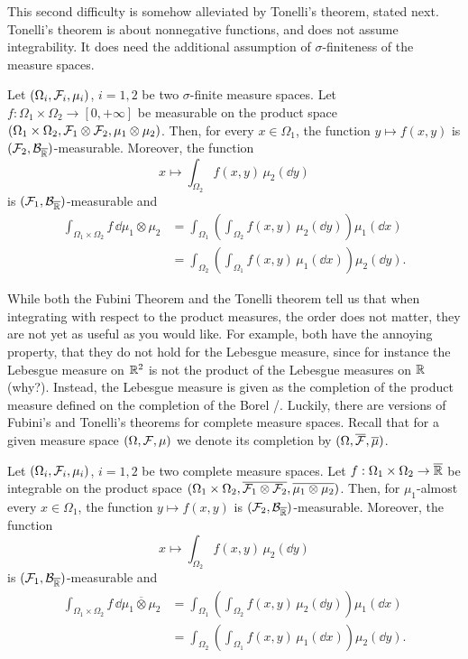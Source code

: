 This second difficulty is somehow alleviated by Tonelli's theorem, stated next. Tonelli's theorem is about nonnegative functions, and does not assume integrability. It does need the additional assumption of $\sigma$-finiteness of the measure spaces.

\begin{theorem}
	Let $(\Omega_i, \mathcal F_i, \mu_i)$, $i=1,2$ be two $\sigma$-finite measure spaces. 
	Let $f : \Omega_1 \times \Omega_2 \to [0,+\infty]$ be measurable on the product space $(\Omega_1 \times \Omega_2, \mathcal F_1 \otimes \mathcal F_2, \mu_1 \otimes \mu_2)$. Then, for every $x \in \Omega_1$, the function $y \mapsto f(x, y)$ is $(\mathcal F_2,\mathcal B_{\overline{\mathbb R}})$-measurable. Moreover, the function 
	\[
	x \mapsto \int_{\Omega_2} f(x,y)\, \mu_2(\dd y)
	\]
	is $(\mathcal F_1,\mathcal B_{\overline{\mathbb R}})$-measurable and
	\[
	\begin{split}
	\int_{\Omega_1 \times \Omega_2} f\, \dd \mu_1 \otimes \mu_2 
	&= \int_{\Omega_1} \left( \int_{\Omega_2 } f(x,  y ) \,\mu_2(\dd y) \right) \mu_1(\dd x)\\
	&= \int_{\Omega_2} \left( \int_{\Omega_1} f(x, y)  \,\mu_1(\dd x) \right) \mu_2(\dd y).
	\end{split}
	\] 
\end{theorem}

While both the Fubini Theorem and the Tonelli theorem tell us that when integrating with respect to the product measures, the order does not matter, they are not yet as useful as you would like. For example, both have the annoying property, that they do not hold for the Lebesgue measure, since for instance the Lebesgue measure on $\mathbb R^2$ is not the product of the Lebesgue measures on $\mathbb R$ (why?). Instead, the Lebesgue measure is given as the completion of the product measure defined on the completion of the Borel \sigalg/. Luckily, there are versions of Fubini's and Tonelli's theorems for complete measure spaces. Recall that for a given measure space $(\Omega, \mathcal F, \mu)$ we denote its completion by $(\Omega, \overline{\mathcal F}, \overline{\mu})$.

\begin{theorem}
Let $(\Omega_i, \mathcal F_i, \mu_i)$, $i=1,2$ be two complete measure spaces. 
Let $f : \Omega_1 \times \Omega_2 \to \overline{\mathbb R}$ be integrable on the product space $(\Omega_1 \times \Omega_2, \overline{\mathcal F_1 \otimes \mathcal F_2}, \overline{\mu_1 \otimes \mu_2})$. Then, for $\mu_1$-almost every $x \in \Omega_1$, the function $y \mapsto f(x, y)$ is $(\mathcal F_2,\mathcal B_{\overline{\mathbb R}})$-measurable. Moreover, the function 
\[
x \mapsto \int_{\Omega_2} f(x,y)\, \mu_2(\dd y)
\]
is $(\mathcal F_1,\mathcal B_{\overline{\mathbb R}})$-measurable and
\[
\begin{split}
\int_{\Omega_1 \times \Omega_2} f\, \dd \overline{\mu_1 \otimes \mu_2} 
&= \int_{\Omega_1} \left( \int_{\Omega_2 } f(x,  y ) \,\mu_2(\dd y) \right) \mu_1(\dd x)\\
&= \int_{\Omega_2} \left( \int_{\Omega_1} f(x, y) \,\mu_1(\dd x) \right) \mu_2(\dd y).
\end{split}
\] 	
\end{theorem}

